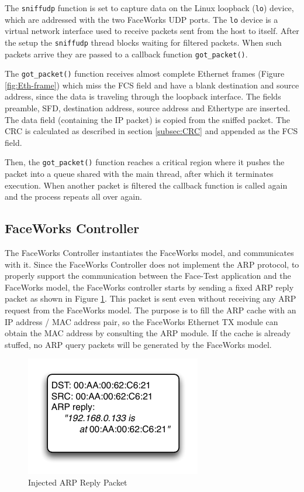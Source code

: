 \documentclass[conference]{IEEEtran}
\begin{document}
The \texttt{sniffudp} function is set to capture data on the Linux loopback ({\tt lo}) device, which are addressed with the two FaceWorks UDP ports. The {\tt lo} device is a virtual network interface used to receive packets sent from the host to itself. After the setup the \texttt{sniffudp} thread blocks waiting for filtered packets. When such packets arrive they are passed to a callback function \texttt{got\_packet()}.

The \texttt{got\_packet()} function receives almost complete Ethernet frames (Figure \ref{fig:Eth-frame}) which miss the FCS field and have a blank destination and source address, since the data is traveling through the loopback interface. The fields preamble, SFD, destination address, source address and Ethertype are inserted. The data field (containing the IP packet) is copied from the sniffed packet. The CRC is calculated as described in section \ref{subsec:CRC} and appended as the FCS field.

Then, the \texttt{got\_packet()} function reaches a critical region where it pushes the packet into a queue shared with the main thread, after which it terminates execution. When another packet is filtered the callback function is called again and the process repeats all over again.


\subsection{FaceWorks Controller}

The FaceWorks Controller instantiates the FaceWorks model, and communicates with it. Since the FaceWorks Controller does not implement the ARP protocol, to properly support the communication between the Face-Test application and the FaceWorks model, the FaceWorks controller starts by sending a fixed ARP reply packet as shown in Figure \ref{fig:Arp-packet}. This packet is sent even without receiving any ARP request from the FaceWorks model. The purpose is to fill the ARP cache with an IP address / MAC address pair, so the FaceWorks Ethernet TX module can obtain the MAC address  by consulting the ARP module. If the cache is already stuffed, no ARP query packets will be generated by the FaceWorks model.

\begin{figure}[h]
  \centering
      \includegraphics[scale=.8,center]{Diagrams/ARP-stuffing.pdf}
  \caption{Injected ARP Reply Packet }\label{fig:Arp-packet}
\end{figure}
\end{document}
